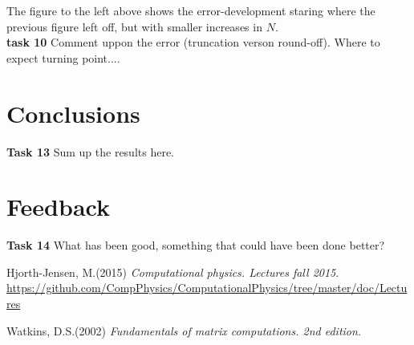 \documentclass{article}
\begin{document}
The figure to the left above shows the error-development staring where the previous figure left off, but with smaller increases in $N$.\\

\textbf{task 10} Comment uppon the error (truncation verson round-off). Where to expect turning point....






\section{Conclusions}
\textbf{Task 13} Sum up the results here.

\section{Feedback}
\textbf{Task 14} What has been good, something that could have been done better?

\begin{thebibliography}{9}
	Hjorth-Jensen, M.(2015)
	\textit{Computational physics. Lectures fall 2015}. 
	\url{https://github.com/CompPhysics/ComputationalPhysics/tree/master/doc/Lectures}
	
	Watkins, D.S.(2002)
	\textit{Fundamentals of matrix computations. 2nd edition.}

\end{thebibliography}
\end{document}
